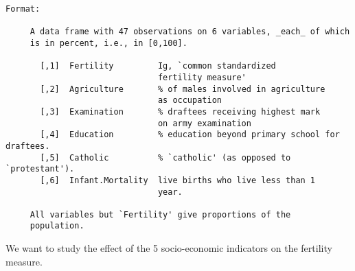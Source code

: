 \documentclass[12pt]{article}
\begin{document}
\begin{verbatim}
Format:

     A data frame with 47 observations on 6 variables, _each_ of which
     is in percent, i.e., in [0,100].

       [,1]  Fertility         Ig, `common standardized                         
                               fertility measure'                               
       [,2]  Agriculture       % of males involved in agriculture                 
                               as occupation                                      
       [,3]  Examination       % draftees receiving highest mark                  
                               on army examination                                
       [,4]  Education         % education beyond primary school for draftees.    
       [,5]  Catholic          % `catholic' (as opposed to `protestant'). 
       [,6]  Infant.Mortality  live births who live less than 1                   
                               year.                                              
      
     All variables but `Fertility' give proportions of the
     population.
\end{verbatim}

\vspace{2mm}

We want to study the effect of the 5 socio-economic indicators on the fertility measure.
\end{document}
